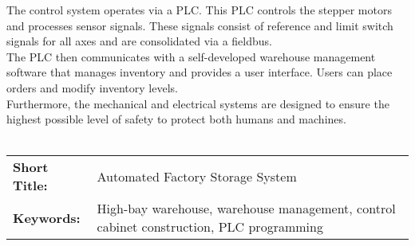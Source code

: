 \documentclass[12pt, twoside]{article}
\begin{document}
The control system operates via a PLC. This PLC controls the stepper motors and processes sensor signals. These signals consist of reference and limit switch signals for all axes and are consolidated via a fieldbus. \\

The PLC then communicates with a self-developed warehouse management software that manages inventory and provides a user interface. Users can place orders and modify inventory levels.\\

Furthermore, the mechanical and electrical systems are designed to ensure the highest possible level of safety to protect both humans and machines.
\\\\
\bgroup
    \def\arraystretch{1.5}
    \begin{tabular}{p{48mm}p{113mm}}
        \textbf{Short Title:} & Automated Factory Storage System\\
        \textbf{Keywords:} & High-bay warehouse, warehouse management, control cabinet construction, PLC programming
    \end{tabular}
\egroup



\newpage

\tableofcontents
\newpage


\newpage

\color{black}
\newpage
{}




\newpage
{}


\newpage
{}


\newpage
{}



\newpage
{}



\newpage
{}
\printbibliography[title=Literaturverzeichnis]

\newpage
\renewcommand{\cftfigpresnum}{Abb. }
\setlength{\cftfignumwidth}{2cm}
\listoffigures

\newpage

\renewcommand{\cfttabpresnum}{Tab. }
\setlength{\cfttabnumwidth}{2cm}
\listoftables
\lstlistoflistings
\end{document}
